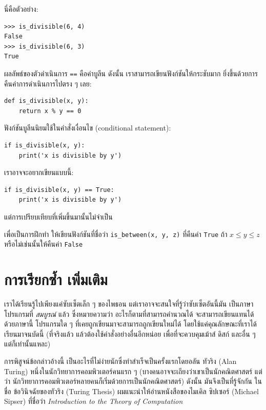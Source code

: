 นี่คือตัวอย่าง:

\begin{verbatim}
>>> is_divisible(6, 4)
False
>>> is_divisible(6, 3)
True
\end{verbatim}
%
ผลลัพธ์ของตัวดำเนินการ {\tt ==} คือค่าบูลีน ดังนั้น เราสามารถเขียนฟังก์ชันให้กระชับมาก
ยิ่งขึ้นด้วยการคืนค่าการดำเนินการไปตรง ๆ เลย:

\begin{verbatim}
def is_divisible(x, y):
    return x % y == 0
\end{verbatim}
%

ฟังก์ชันบูลีนนิยมใช้ในคำสั่งเงื่อนไข (conditional statement):

\begin{verbatim}
if is_divisible(x, y):
    print('x is divisible by y')
\end{verbatim}
%
เราอาจจะอยากเขียนแบบนี้:

\begin{verbatim}
if is_divisible(x, y) == True:
    print('x is divisible by y')
\end{verbatim}
%
แต่การเปรียบเทียบที่เพิ่มขึ้นมานั้นไม่จำเป็น

เพื่อเป็นการฝึกทำ ให้เขียนฟังก์ชันที่ชื่อว่า \verb"is_between(x, y, z)" ที่คืนค่า 
{\tt True} ถ้า $x \le y \le z$ หรือไม่เช่นนั้นให้คืนค่า {\tt False}


\section{การเรียกซ้ำ เพิ่มเติม} %
\label{more.recursion}

เราได้เรียนรู้ไปเพียงแค่ซับเซ็ตเล็ก ๆ ของไพธอน แต่เราอาจจะสนใจที่รู้ว่าซับเซ็ตอันนี้มัน
เป็นภาษาโปรแกรมที่ {\em สมบูรณ์} แล้ว ซึ่งหมายความว่า อะไรก็ตามที่สามารถคำนวณได้
จะสามารถเขียนแทนได้ด้วยภาษานี้  โปรแกรมใด ๆ ที่เคยถูกเขียนมาจะสามารถถูกเขียนใหม่ได้
โดยใช้แค่คุณลักษณะที่เราได้เรียนมาจนบัดนี้ (ที่จริงแล้ว แล้วต้องใช้คำสั่งอย่างอื่นอีกหน่อย
เพื่อที่จะควบคุมเม้าส์ ดิสก์ และอื่น ๆ แต่ก็เท่านั้นแหละ)

การพิสูจน์ข้อกล่าวอ้างนี้ เป็นอะไรที่ไม่ง่ายนักซึ่งทำสำเร็จเป็นครั้งแรกโดยอลัน ทัวริง (Alan Turing) 
หนึ่งในนักวิทยาการคอมพิวเตอร์คนแรก ๆ (บางคนอาจจะเถียงว่าเขาเป็นนักคณิตศาสตร์ แต่ว่า
นักวิทยาการคอมพิวเตอร์หลายคนก็เริ่มด้วยการเป็นนักคณิตศาสตร์)  ดังนั้น มันจึงเป็นที่รู้จักกัน
ในชื่อ ข้อวินิจฉัยของทัวริง (Turing Thesis) ผมแนะนำให้อ่านหนังสือของไมเคิล ซิปเซอร์ 
(Michael Sipser) ที่ชื่อว่า {\em Introduction to the Theory of Computation}

